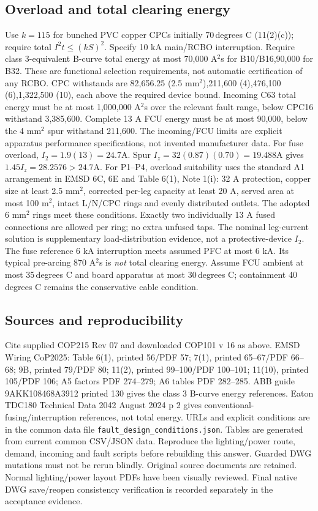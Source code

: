 \documentclass[11pt]{article}
\begin{document}
\subsection*{Overload and total clearing energy}
Use $k=115$ for bunched PVC copper CPCs initially 70\,degrees C (11(2)(c));  require total $I^2t\le(kS)^2$. Specify 10 kA main/RCBO interruption. Require class 3-equivalent B-curve total energy at most 70,000 A$^2$s for B10/B16,90,000 for B32. These are functional selection requirements, not automatic certification of any RCBO. CPC withstands are 82,656.25 (2.5 mm$^2$),211,600 (4),476,100 (6),1,322,500 (10), each above the required device bound.
Incoming C63 total energy must be at most 1,000,000 A$^2$s over the relevant fault range, below CPC16 withstand 3,385,600. Complete 13 A FCU energy must be at most 90,000, below the 4 mm$^2$ spur withstand 211,600. The incoming/FCU limits are explicit apparatus performance specifications, not invented manufacturer data.
For fuse overload, $I_2=1.9(13)=24.7$A. Spur $I_z=32(0.87)(0.70)=19.488$A gives $1.45I_z=28.2576>24.7$A. For P1--P4, overload suitability uses the standard A1 arrangement in EMSD 6C, 6E and Table 6(1), Note 1(i): 32 A protection, copper size at least 2.5 mm$^2$, corrected per-leg capacity at least 20 A, served area at most 100 m$^2$, intact L/N/CPC rings and evenly distributed outlets. The adopted 6 mm$^2$ rings meet these conditions. Exactly two individually 13 A fused connections are allowed per ring; no extra unfused taps. The nominal leg-current solution is supplementary load-distribution evidence, not a protective-device $I_2$. The fuse reference 6 kA interruption meets assumed PFC at most 6 kA. Its typical pre-arcing 870 A$^2$s is \emph{not} total clearing energy. Assume FCU ambient at most 35\,degrees C and board apparatus at most 30\,degrees C;  containment 40\,degrees C remains the conservative cable condition.
\subsection*{Sources and reproducibility}
Cite supplied COP215 Rev 07 and downloaded COP101 v 16 as above. EMSD Wiring CoP2025: Table 6(1), printed 56/PDF 57; 7(1), printed 65--67/PDF 66--68; 9B, printed 79/PDF 80; 11(2), printed 99--100/PDF 100--101; 11(10), printed 105/PDF 106;  A5 factors PDF 274--279;  A6 tables PDF 282--285.
ABB guide 9AKK108468A3912 printed 130 gives the class 3 B-curve energy references. Eaton TDC180 Technical Data 2042 August 2024 p 2 gives conventional-fusing/interruption references, not total energy. URLs and explicit conditions are in the common data file \texttt{fault\_design\_conditions.json}.
Tables are generated from current common CSV/JSON data. Reproduce the lighting/power route, demand, incoming and fault scripts before rebuilding this answer. Guarded DWG mutations must not be rerun blindly. Original source documents are retained. Normal lighting/power layout PDFs have been visually reviewed. Final native DWG save/reopen consistency verification is recorded separately in the acceptance evidence.
\end{document}
